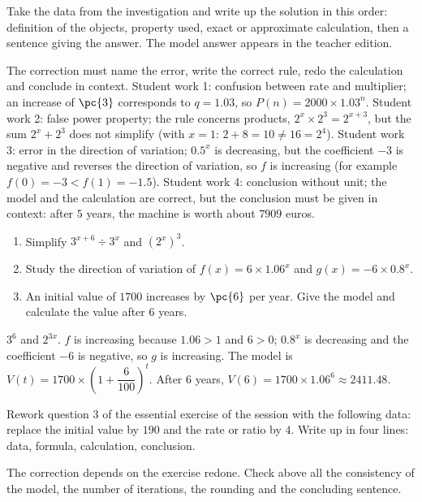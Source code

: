 \begin{example}
Take the data from the investigation and write up the solution in this order: definition of the objects, property used, exact or approximate calculation, then a sentence giving the answer. The model answer appears in the teacher edition.
\end{example}
\begin{solution}The correction must name the error, write the correct rule, redo the calculation and conclude in context. Student work 1: confusion between rate and multiplier; an increase of $\pc{3}$ corresponds to $q=\num{1,03}$, so $P(n)=\num{2000}\times\num{1,03}^n$. Student work 2: false power property; the rule concerns products, $2^x\times2^3=2^{x+3}$, but the sum $2^x+2^3$ does not simplify (with $x=1$: $2+8=10\neq16=2^4$). Student work 3: error in the direction of variation; $\num{0,5}^x$ is decreasing, but the coefficient $-3$ is negative and reverses the direction of variation, so $f$ is increasing (for example $f(0)=-3<f(1)=-\num{1,5}$). Student work 4: conclusion without unit; the model and the calculation are correct, but the conclusion must be given in context: after $5$ years, the machine is worth about $\num{7909}$ euros.\end{solution}

\begin{exercise}[essential]
\begin{enumerate}\item Simplify $3^{x+6}\div3^x$ and $(2^x)^3$.\item Study the direction of variation of $f(x)=6\times\num{1,06}^x$ and $g(x)=-6\times\num{0,8}^x$.\item An initial value of $1700$ increases by $\pc{6}$ per year. Give the model and calculate the value after $6$ years.\end{enumerate}
\end{exercise}
\begin{solution}$3^6$ and $2^{3x}$. $f$ is increasing because $\num{1,06}>1$ and $6>0$; $\num{0,8}^x$ is decreasing and the coefficient $-6$ is negative, so $g$ is increasing. The model is $V(t)=1700\times\left(1+\dfrac{6}{100}\right)^t$. After $6$ years, $V(6)=1700\times\num{1,06}^6\approx\num{2411,48}$.\end{solution}


\begin{homework}Rework question 3 of the essential exercise of the session with the following data: replace the initial value by $190$ and the rate or ratio by $4$. Write up in four lines: data, formula, calculation, conclusion.\end{homework}
\begin{solution}The correction depends on the exercise redone. Check above all the consistency of the model, the number of iterations, the rounding and the concluding sentence.\end{solution}

